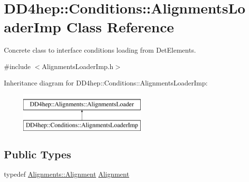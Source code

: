 \hypertarget{class_d_d4hep_1_1_conditions_1_1_alignments_loader_imp}{}\section{D\+D4hep\+:\+:Conditions\+:\+:Alignments\+Loader\+Imp Class Reference}
\label{class_d_d4hep_1_1_conditions_1_1_alignments_loader_imp}


Concrete class to interface conditions loading from Det\+Elements.  




{\ttfamily \#include $<$Alignments\+Loader\+Imp.\+h$>$}

Inheritance diagram for D\+D4hep\+:\+:Conditions\+:\+:Alignments\+Loader\+Imp\+:\begin{figure}[H]
\begin{center}
\leavevmode
\includegraphics[height=2.000000cm]{class_d_d4hep_1_1_conditions_1_1_alignments_loader_imp}
\end{center}
\end{figure}
\subsection*{Public Types}
\begin{DoxyCompactItemize}
\item 
typedef \hyperlink{class_d_d4hep_1_1_alignments_1_1_alignment}{Alignments\+::\+Alignment} \hyperlink{class_d_d4hep_1_1_conditions_1_1_alignments_loader_imp_a2af19e971736ac6856523194f7eb717a}{Alignment}
\end{DoxyCompactItemize}
